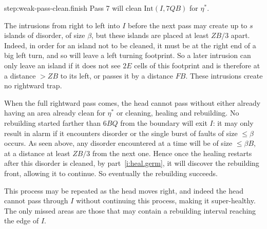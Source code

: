 \documentclass[11pt]{memoir}
\theoremstyle{definition} %
\renewcommand{\le}{\leq}
\def\B{B}
\newcommand{\E}{E} %
\newcommand{\F}{F}
\newcommand{\Int}{\mathrm{Int}} %
\newcommand{\Q}{Q} %
\newcommand{\s}{s} %
\newcommand{\Z}{Z} %
\begin{document}
\begin{Proof}
\begin{step+}{step:weak-pass-clean.finish}
  Pass 7 will clean \( \Int(I, 7\Q\B) \) for \( \eta^{*} \).
\end{step+}
\begin{pproof}
  The intrusions from right to left into \( I \) before the next pass
  may create up to \( \s \) islands of disorder, of size \( \beta \),
  but these islands are placed at least \( \Z\B/3 \) apart.
  Indeed, in order for an island not to be cleaned, it must be at the right end of a big left turn,
  and so will leave a left turning footprint.
  So a later intrusion can only leave an island if it does not see \( 2\E \) cells of this
  footprint and is therefore at a distance \( >\Z\B \) to its left, or passes it by a distance \( \F\B \).
  These intrusions create no rightward trap.

  When the full rightward pass comes, the head 
  cannot pass without either already having an area already clean for \( \eta^{*} \) or
  cleaning, healing and rebuilding.
  No rebuilding started farther than \( 6\B\Q \) from the boundary will exit \( I \): it may only result in
  alarm if it encounters disorder or the single burst of faults of size \( \le\beta \) occurs.
  As seen above, any disorder encountered at a time will be of size \( \le\beta\B \), at a distance
  at least \( \Z\B/3 \) from the next one.
  Hence once the healing restarts after this disorder is cleaned,
  by part~\eqref{i:heal.germ}, it will discover the rebuilding front, allowing it to continue.
  So eventually the rebuilding succeeds.

  This process may be repeated as the head moves right, and indeed the head cannot pass through \( I \)
  without continuing this process, making it super-healthy.
  The only missed areas are those that may contain a rebuilding interval
  reaching the edge of \( I \).
\end{pproof} %
\end{Proof}


\end{document}
